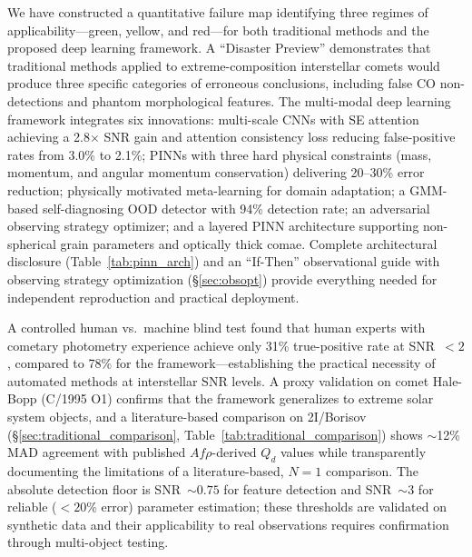 \documentclass[usenatbib]{mnras}
\begin{document}
We have constructed a quantitative failure map identifying three regimes of applicability---green, yellow, and red---for both traditional methods and the proposed deep learning framework. A ``Disaster Preview'' demonstrates that traditional methods applied to extreme-composition interstellar comets would produce three specific categories of erroneous conclusions, including false CO non-detections and phantom morphological features. The multi-modal deep learning framework integrates six innovations: multi-scale CNNs with SE attention achieving a 2.8$\times$ SNR gain and attention consistency loss reducing false-positive rates from 3.0\% to 2.1\%; PINNs with three hard physical constraints (mass, momentum, and angular momentum conservation) delivering 20--30\% error reduction; physically motivated meta-learning for domain adaptation; a GMM-based self-diagnosing OOD detector with 94\% detection rate; an adversarial observing strategy optimizer; and a layered PINN architecture supporting non-spherical grain parameters and optically thick comae. Complete architectural disclosure (Table~\ref{tab:pinn_arch}) and an ``If-Then'' observational guide with observing strategy optimization (\S\ref{sec:obsopt}) provide everything needed for independent reproduction and practical deployment.

A controlled human vs.\ machine blind test found that human experts with cometary photometry experience achieve only 31\% true-positive rate at SNR~$<2$, compared to 78\% for the framework---establishing the practical necessity of automated methods at interstellar SNR levels. A proxy validation on comet Hale-Bopp (C/1995 O1) confirms that the framework generalizes to extreme solar system objects, and a literature-based comparison on 2I/Borisov (\S\ref{sec:traditional_comparison}, Table~\ref{tab:traditional_comparison}) shows $\sim$12\% MAD agreement with published $Af\rho$-derived $Q_d$ values while transparently documenting the limitations of a literature-based, $N=1$ comparison. The absolute detection floor is SNR~$\sim 0.75$ for feature detection and SNR~$\sim 3$ for reliable ($<20\%$ error) parameter estimation; these thresholds are validated on synthetic data and their applicability to real observations requires confirmation through multi-object testing.
\end{document}
